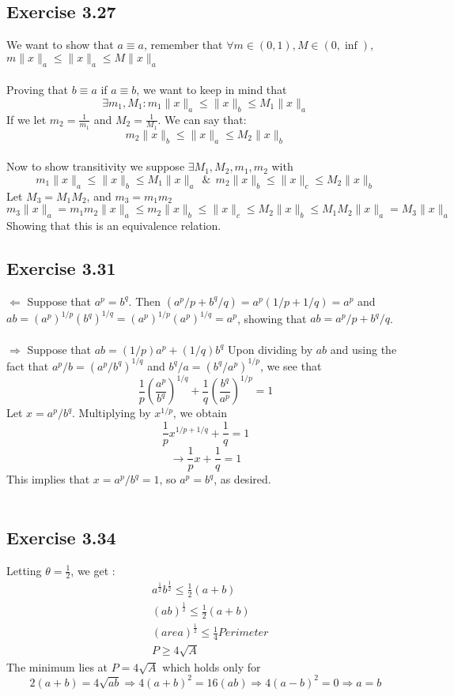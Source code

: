 \documentclass[letterpaper,12pt]{article}
\theoremstyle{definition}
\begin{document}
\subsection*{Exercise 3.27}
We want to show that $a\equiv a$, remember that $\forall m \in (0,1), M \in (0, \inf)$, $m\|x\|_a \leq \|x\|_a \leq M \|x\| _a$\\
\smallskip\\ 
Proving that $ b \equiv a$ if $a \equiv b$, we want to keep in mind that 
\[\exists m_1,M_1: m_1\|x\|_a \leq \|x\|_b \leq M_1\|x\|_a \] If we let $m_2 = \frac{1}{m_1}$ and $ M_2 = \frac{1}{M_1}$. We can say that:\\
\[m_2\|x\|_b \leq \|x\|_a \leq M_2\|x\|_b \]
\smallskip\\
Now to show transitivity we suppose $\exists M_1,M_2,m_1,m_2$ with \\
\[m_1\|x\|_a \leq \|x\|_b \leq M_1 \|x\|_a ~~\&~~
 m_2\|x\|_b \leq \|x\|_c \leq M_2 \|x\|_b \] 
Let $M_3 = M_1 M_2$, and $m_3 = m_1 m_2$\\
\[m_3 \|x \|_a = m_1m_2\|x\|_a \leq m_2 \|x\|_b \leq \|x\|_c \leq M_2 \|x\|_b \leq M_1M_2 \|x\|_a = M_3 \|x\|_a\]
Showing that this is an equivalence relation.

\subsection*{Exercise 3.31}
$\Leftarrow$ Suppose that $a^{p} = b^{q}$. Then $(a^{p}/p+b^{q}/q)=a^{p}(1/p+1/q)=a^{p}$ and $ab = (a^{p})^{1/p}(b^{q})^{1/q}=(a^{p})^{1/p}(a^{p})^{1/q}=a^{p}$, showing that $ab = a^{p}/p+b^{q}/q$. \\ \\
$\Rightarrow$ Suppose that $ab=(1/p)a^{p}+(1/q)b^{q}$ Upon dividing by $ab$ and using the fact that $a^{p}/b=(a^{p}/b^{q})^{1/q}$ and $b^{q}/a=(b^{q}/a^{p})^{1/p}$, we see that \[ \frac{1}{p}(\frac{a^{p}}{b^{q}})^{1/q}+\frac{1}{q}(\frac{b^{q}}{a^{p}})^{1/p}=1\]
Let $x= a^{p}/b^{q}$. Multiplying by $x^{1/p}$, we obtain 
\[ \frac{1}{p}x^{1/p+1/q}+\frac{1}{q}=1\]
 \[\rightarrow \frac{1}{p}x+\frac{1}{q}=1\]
 This implies that $x= a^{p}/b^{q}=1$, so $a^{p}= b^{q}$, as desired.\\\\

\subsection*{Exercise 3.34}
Letting $\theta=\frac{1}{2}$, we get : 
\begin{align*}
&a^\frac{1}{2}b^\frac{1}{2} \leq \frac{1}{2} (a+b) \\
&(ab)^\frac{1}{2} \leq \frac{1}{2} (a+b) \\
&(area)^\frac{1}{2} \leq \frac{1}{4} Perimeter \\
& P \geq 4 \sqrt{A}
\end{align*}
The minimum lies at $P=4 \sqrt{A}$ which holds only for 
\[2(a+b)=4\sqrt{ab} \Rightarrow 4(a+b)^2 = 16(ab) \Rightarrow 4(a-b)^2=0 \Rightarrow a=b \]
\end{document}
